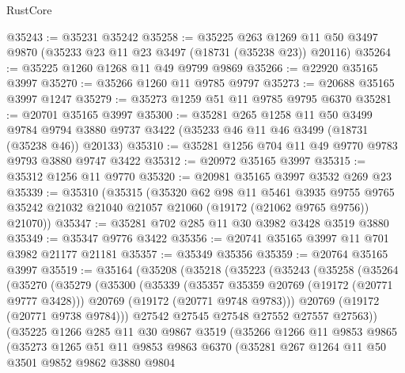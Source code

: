 \begin{lexlean}{RustCore}
\begin{coremodule}
@35243 := @35231 @35242
@35258 := @35225
    @263
    @1269
    @11
    @50
    @3497
    @9870
    (@35233 @23 @11 @23 @3497 (@18731 (@35238 @23)) @20116)
@35264 := @35225 @1260 @1268 @11 @49 @9799 @9869
@35266 := @22920 @35165 @3997
@35270 := @35266 @1260 @11 @9785 @9797
@35273 := @20688 @35165 @3997 @1247
@35279 := @35273 @1259 @51 @11 @9785 @9795 @6370
@35281 := @20701 @35165 @3997
@35300 := @35281
    @265
    @1258
    @11
    @50
    @3499
    @9784
    @9794
    @3880
    @9737
    @3422
    (@35233 @46 @11 @46 @3499 (@18731 (@35238 @46)) @20133)
@35310 := @35281 @1256 @704 @11 @49 @9770 @9783 @9793 @3880 @9747 @3422
@35312 := @20972 @35165 @3997
@35315 := @35312 @1256 @11 @9770
@35320 := @20981 @35165 @3997 @3532 @269 @23
@35339 := @35310
    (@35315
      (@35320
        @62
        @98
        @11
        @5461
        @3935
        @9755
        @9765
        @35242
        @21032
        @21040
        @21057
        @21060
        (@19172 (@21062 @9765 @9756))
        @21070))
@35347 := @35281 @702 @285 @11 @30 @3982 @3428 @3519 @3880
@35349 := @35347 @9776 @3422
@35356 := @20741 @35165 @3997 @11 @701 @3982 @21177 @21181
@35357 := @35349 @35356
@35359 := @20764 @35165 @3997
@35519 := @35164
    (@35208
      (@35218
        (@35223
          (@35243
            (@35258
              (@35264
                (@35270
                  (@35279
                    (@35300
                      (@35339
                        (@35357 @35359 @20769 (@19172 (@20771 @9777 @3428)))
                        @20769
                        (@19172 (@20771 @9748 @9783)))
                      @20769
                      (@19172 (@20771 @9738 @9784)))
                    @27542
                    @27545
                    @27548
                    @27552
                    @27557
                    @27563))
                (@35225
                  @1266
                  @285
                  @11
                  @30
                  @9867
                  @3519
                  (@35266
                    @1266
                    @11
                    @9853
                    @9865
                    (@35273
                      @1265
                      @51
                      @11
                      @9853
                      @9863
                      @6370
                      (@35281
                        @267
                        @1264
                        @11
                        @50
                        @3501
                        @9852
                        @9862
                        @3880
                        @9804

\end{coremodule}
\end{lexlean}
